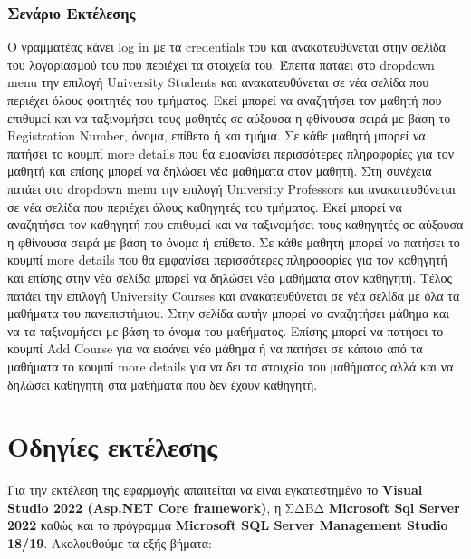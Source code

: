 \documentclass[12pt]{article}
\begin{document}
	
\subsubsection{Σενάριο Εκτέλεσης}
Ο γραμματέας κάνει log in με τα credentials του και ανακατευθύνεται στην σελίδα του λογαριασμού του που περιέχει τα στοιχεία του. Έπειτα πατάει στο dropdown menu την επιλογή University Students και ανακατευθύνεται σε νέα σελίδα που περιέχει όλους φοιτητές του τμήματος. Εκεί μπορεί να αναζητήσει τον μαθητή που επιθυμεί και να ταξινομήσει τους μαθητές σε αύξουσα η φθίνουσα σειρά με βάση το Registration Number, όνομα, επίθετο ή και τμήμα. Σε κάθε μαθητή μπορεί να πατήσει το κουμπί more details που θα εμφανίσει περισσότερες πληροφορίες  για τον μαθητή και επίσης μπορεί να δηλώσει νέα μαθήματα στον μαθητή. Στη συνέχεια πατάει στο dropdown menu την επιλογή University Professors και ανακατευθύνεται σε νέα σελίδα που περιέχει όλους καθηγητές του τμήματος. Εκεί μπορεί να αναζητήσει τον καθηγητή που επιθυμεί και να ταξινομήσει τους καθηγητές σε αύξουσα η φθίνουσα σειρά με βάση το  όνομα ή  επίθετο. Σε κάθε μαθητή μπορεί να πατήσει το κουμπί more details που θα εμφανίσει περισσότερες πληροφορίες  για τον καθηγητή και επίσης στην νέα σελίδα μπορεί να δηλώσει νέα μαθήματα στον καθηγητή. Τέλος πατάει την επιλογή University Courses και ανακατευθύνεται σε νέα σελίδα με όλα τα μαθήματα του πανεπιστήμιου. Στην σελίδα αυτήν μπορεί να αναζητήσει μάθημα και να τα ταξινομήσει με βάση το όνομα του μαθήματος. Επίσης μπορεί να πατήσει το κουμπί Add Course για να εισάγει νέο μάθημα ή να πατήσει σε κάποιο από τα μαθήματα το κουμπί more details για να δει τα στοιχεία του μαθήματος αλλά και να δηλώσει καθηγητή στα μαθήματα που δεν έχουν καθηγητή.

	

\section{Οδηγίες εκτέλεσης}
Για την εκτέλεση της εφαρμογής απαιτείται να είναι εγκατεστημένο το \textbf{Visual Studio 2022 (Asp.NET Core framework)}, η ΣΔΒΔ \textbf{Microsoft Sql Server 2022} καθώς και το πρόγραμμα \textbf{Microsoft SQL Server Management Studio 18/19}. Ακολουθούμε τα εξής βήματα:
\end{document}
